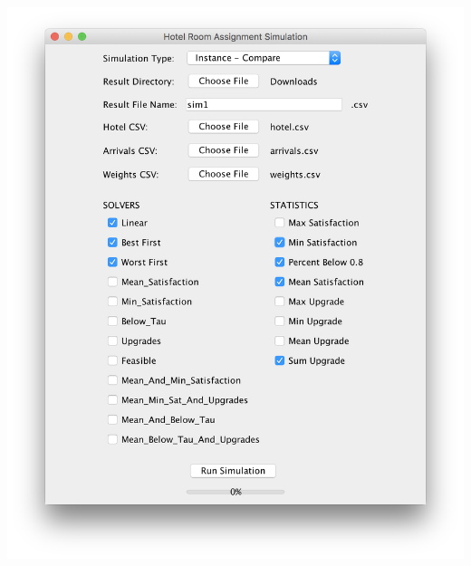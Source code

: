 \documentclass[11 pt]{article}
\begin{document}
\begin{center}
\includegraphics[scale=0.4]{images/sim1Screen.png}
\end{center}
\end{document}
